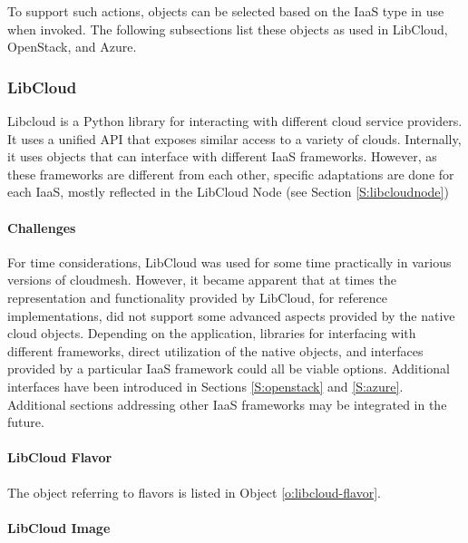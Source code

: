 \documentclass[10pt]{article}
\begin{document}
To support such actions, objects can be selected based on the
IaaS type in use when invoked. The following subsections list these objects as used in
LibCloud, OpenStack, and Azure. 

\subsubsection{LibCloud}

Libcloud is a Python library for interacting with different cloud
service providers. It uses a unified API that exposes similar access
to a variety of clouds. Internally, it uses objects that can
interface with different IaaS frameworks. However, as these frameworks
are different from each other, specific adaptations are done for
each IaaS, mostly reflected in the LibCloud Node (see Section
\ref{S:libcloudnode})

\paragraph{Challenges}

For time considerations, LibCloud was used for some time practically in various versions of
cloudmesh. However, it became apparent that at times the representation and
functionality provided by LibCloud, for reference implementations, did
not support some advanced aspects provided by the native cloud
objects. Depending on the application, libraries for interfacing with different frameworks, 
direct utilization of the native
objects, and interfaces provided by a particular IaaS framework could all be viable options. 
Additional interfaces have been introduced in
Sections \ref{S:openstack} and \ref{S:azure}. 
Additional sections addressing other IaaS frameworks may be integrated in the future.

\paragraph{LibCloud Flavor}

The object referring to flavors is listed in Object \ref{o:libcloud-flavor}.


\paragraph{LibCloud Image}
\end{document}
